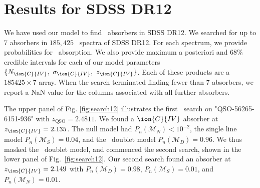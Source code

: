 \documentclass[fleqn,usenatbib]{mnras}
\newcommand{\civ}{\ion{C}{IV}}
\newcommand{\nciv}{N_{\civ}} %
\newcommand{\zciv}{z_{\civ}}
\newcommand{\sciv}{\sigma_{\civ}}
\newcommand{\zqso}{z_{\textrm{QSO}}}
\newcommand{\model}{\mathcal{M}}
\newcommand{\spb}[1]{\textcolor{red}{[\bf SPB: #1]}}
\newcommand{\rmon}[1]{\textcolor{rez}{[\bf RM: #1]}}
\begin{document}





\section{Results for SDSS DR12}
\label{sec:results}

We have used our model to find \civ\ absorbers in SDSS DR12. We searched for up to $7$ absorbers in $185,425$ \civ\ spectra of SDSS DR12.
For each spectrum, we provide probabilities for  \civ\ absorption. We also provide maximum a posteriori and 68\% credible
intervals for each of our model parameters $\{\nciv,~ \sciv,~ \zciv\}$.
Each of these products are a $185425\times7$ array. When the search terminated
finding fewer than $7$ absorbers, we report a NaN value for the columns associated with all further absorbers.

The upper panel of Fig. \ref{fig:search12} illustrates the first \civ~search on "QSO-56265-6151-936" with $\zqso = 2.4811$. We found a $\civ$ absorber at $\zciv=2.135$. The null model had $P_n(\model_{N}) < 10^{-2}$, the single line model $P_n({\model_S})=0.04$, and the \civ\ doublet model $P_n({\model_D})=0.96$. We thus masked the \civ\ doublet model, and commenced the second
search, shown in the lower panel of Fig.~\ref{fig:search12}.
Our second search found an absorber at $\zciv=2.149$ with $P_n({\model_D})=0.98$,
$P_n({\model_S})=0.01$, and $P_n({\model_{N}})=0.01$.
\end{document}
